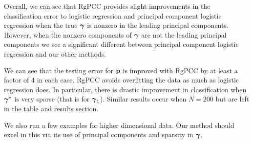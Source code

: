 \documentclass[main.tex]{subfiles}
\begin{document}
Overall, we can see that RgPCC provides slight improvements in the classification error to logistic regression and principal component logistic regression when the true $\boldsymbol \gamma$ is nonzero in the leading principal components. However, when the nonzero components of $\boldsymbol \gamma$ are not the leading principal components we see a significant different between principal component logistic regression and our other methods.


We can see that the testing error for $\mathbf{p}$ is improved with RgPCC by at least a factor of 4 in each case. RgPCC avoids overfitting the data as much as logistic regression does. In particular, there is drastic improvement in classification when $\boldsymbol \gamma^*$ is very sparse (that is for $\boldsymbol \gamma_1$). Similar results occur when $N = 200$ but are left in the table and results section.

We also run a few examples for higher dimensional data. Our method should excel in this via its use of principal components and sparsity in $\boldsymbol \gamma$.
\end{document}
